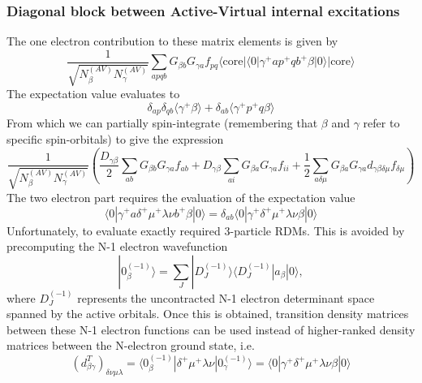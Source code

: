 \documentclass[a4paper,oneside,11pt]{article}
\numberwithin{equation}{section}
\newcommand{\DMETBra}{\langle \mathrm{core}|\langle 0|}
\newcommand{\DMETKet}{|0\rangle| \mathrm{core} \rangle}
\begin{document}
\subsubsection{Diagonal block between Active-Virtual internal excitations}
\label{sec:AVDiag}
The one electron contribution to these matrix elements is given by
\begin{equation}
\frac{1}{\sqrt{N^{(AV)}_{\beta}N^{(AV)}_{\gamma}}} \sum_{apqb} G_{\beta b} G_{\gamma a} f_{pq} \DMETBra \gamma^{+} a p^{+} q b^{+} \beta \DMETKet
\end{equation}
The expectation value evaluates to
\begin{equation}
\delta_{ap} \delta_{qb} \langle \gamma^{+} \beta \rangle + \delta_{ab} \langle \gamma^{+} p^{+} q \beta \rangle
\end{equation}
From which we can partially spin-integrate (remembering that $\beta$ and $\gamma$ refer to specific spin-orbitals) to give the expression
\begin{equation}
\frac{1}{\sqrt{N^{(AV)}_{\beta}N^{(AV)}_{\gamma}}} \left( \frac{D_{\gamma \beta}}{2} \sum_{ab} G_{\beta b} G_{\gamma a} f_{ab} + D_{\gamma \beta} \sum_{ai} G_{\beta a} G_{\gamma a} f_{ii} + \frac{1}{2}\sum_{a \delta \mu} G_{\beta a} G_{\gamma a} d_{\gamma \beta \delta \mu} f_{\delta \mu} \right ) \label{DiagAVBlock}
\end{equation}
The two electron part requires the evaluation of the expectation value
\begin{equation}
\langle 0 | \gamma^{+} a \delta^{+} \mu^{+} \lambda \nu b^{+} \beta | 0 \rangle = \delta_{ab} \langle 0 | \gamma^{+} \delta^{+} \mu^{+} \lambda \nu \beta | 0 \rangle
\end{equation}
Unfortunately, to evaluate exactly required 3-particle RDMs. This is avoided by precomputing the N-1 electron wavefunction
\begin{equation}
|0^{(-1)}_{\beta} \rangle = \sum_J |D_J^{(-1)} \rangle \langle D_J^{(-1)} | a_{\beta} |0\rangle ,
\end{equation}
where $D_J^{(-1)}$ represents the uncontracted N-1 electron determinant space spanned by the active orbitals.
Once this is obtained, transition density matrices between these N-1 electron functions can be used instead of higher-ranked density matrices between the N-electron ground state, i.e.
\begin{equation}
(d^T_{\beta \gamma})_{\delta \nu \mu \lambda} = \langle 0^{(-1)}_{\beta} | \delta^{+} \mu^{+} \lambda \nu | 0^{(-1)}_{\gamma} \rangle = \langle 0 | \gamma^{+} \delta^{+} \mu^{+} \lambda \nu \beta | 0 \rangle
\end{equation}
\end{document}
